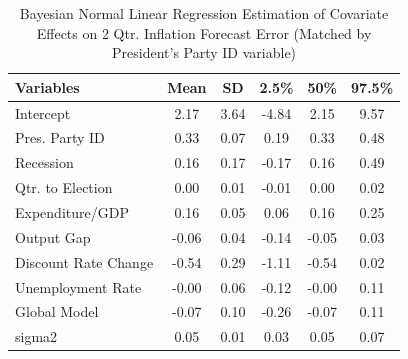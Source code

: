 \documentclass[a4paper]{article}\usepackage{graphicx, color}
\begin{document}

\begin{table}[ht]
\centering
\caption{Bayesian Normal Linear Regression Estimation of Covariate Effects on 2 Qtr. Inflation Forecast Error (Matched by President's Party ID variable)} 
\label{OutputPB}
{\small
\begin{tabular}{lccccc}
  \hline
Variables & Mean & SD & 2.5\% & 50\% & 97.5\% \\ 
  \hline
Intercept & 2.17 & 3.64 & -4.84 & 2.15 & 9.57 \\ 
  Pres. Party ID & 0.33 & 0.07 & 0.19 & 0.33 & 0.48 \\ 
  Recession & 0.16 & 0.17 & -0.17 & 0.16 & 0.49 \\ 
  Qtr. to Election & 0.00 & 0.01 & -0.01 & 0.00 & 0.02 \\ 
  Expenditure/GDP & 0.16 & 0.05 & 0.06 & 0.16 & 0.25 \\ 
  Output Gap & -0.06 & 0.04 & -0.14 & -0.05 & 0.03 \\ 
  Discount Rate Change & -0.54 & 0.29 & -1.11 & -0.54 & 0.02 \\ 
  Unemployment Rate & -0.00 & 0.06 & -0.12 & -0.00 & 0.11 \\ 
  Global Model & -0.07 & 0.10 & -0.26 & -0.07 & 0.11 \\ 
  sigma2 & 0.05 & 0.01 & 0.03 & 0.05 & 0.07 \\ 
   \hline
\end{tabular}
}
\end{table}



\end{document}
